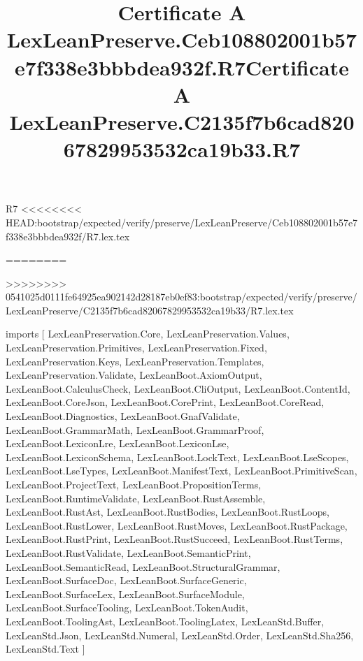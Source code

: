 \begin{lexlean}{R7}
<<<<<<<< HEAD:bootstrap/expected/verify/preserve/LexLeanPreserve/Ceb108802001b57e7f338e3bbbdea932f/R7.lex.tex
\title{Certificate A LexLeanPreserve.Ceb108802001b57e7f338e3bbbdea932f.R7}
========
\title{Certificate A LexLeanPreserve.C2135f7b6cad82067829953532ca19b33.R7}
>>>>>>>> 0541025d0111fe64925ea902142d28187eb0ef83:bootstrap/expected/verify/preserve/LexLeanPreserve/C2135f7b6cad82067829953532ca19b33/R7.lex.tex
\begin{coremodule}
imports [
  LexLeanPreservation.Core,
  LexLeanPreservation.Values,
  LexLeanPreservation.Primitives,
  LexLeanPreservation.Fixed,
  LexLeanPreservation.Keys,
  LexLeanPreservation.Templates,
  LexLeanPreservation.Validate,
  LexLeanBoot.AxiomOutput,
  LexLeanBoot.CalculusCheck,
  LexLeanBoot.CliOutput,
  LexLeanBoot.ContentId,
  LexLeanBoot.CoreJson,
  LexLeanBoot.CorePrint,
  LexLeanBoot.CoreRead,
  LexLeanBoot.Diagnostics,
  LexLeanBoot.GnafValidate,
  LexLeanBoot.GrammarMath,
  LexLeanBoot.GrammarProof,
  LexLeanBoot.LexiconLre,
  LexLeanBoot.LexiconLse,
  LexLeanBoot.LexiconSchema,
  LexLeanBoot.LockText,
  LexLeanBoot.LseScopes,
  LexLeanBoot.LseTypes,
  LexLeanBoot.ManifestText,
  LexLeanBoot.PrimitiveScan,
  LexLeanBoot.ProjectText,
  LexLeanBoot.PropositionTerms,
  LexLeanBoot.RuntimeValidate,
  LexLeanBoot.RustAssemble,
  LexLeanBoot.RustAst,
  LexLeanBoot.RustBodies,
  LexLeanBoot.RustLoops,
  LexLeanBoot.RustLower,
  LexLeanBoot.RustMoves,
  LexLeanBoot.RustPackage,
  LexLeanBoot.RustPrint,
  LexLeanBoot.RustSucceed,
  LexLeanBoot.RustTerms,
  LexLeanBoot.RustValidate,
  LexLeanBoot.SemanticPrint,
  LexLeanBoot.SemanticRead,
  LexLeanBoot.StructuralGrammar,
  LexLeanBoot.SurfaceDoc,
  LexLeanBoot.SurfaceGeneric,
  LexLeanBoot.SurfaceLex,
  LexLeanBoot.SurfaceModule,
  LexLeanBoot.SurfaceTooling,
  LexLeanBoot.TokenAudit,
  LexLeanBoot.ToolingAst,
  LexLeanBoot.ToolingLatex,
  LexLeanStd.Buffer,
  LexLeanStd.Json,
  LexLeanStd.Numeral,
  LexLeanStd.Order,
  LexLeanStd.Sha256,
  LexLeanStd.Text
]


\end{coremodule}
\end{lexlean}
